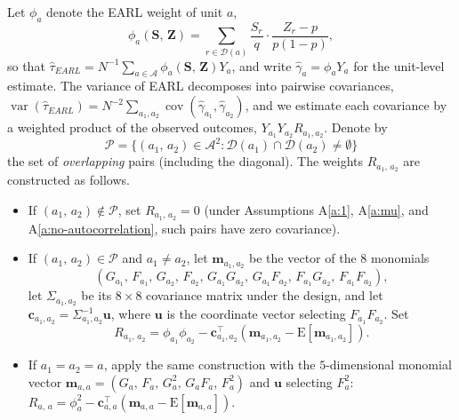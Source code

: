 \documentclass[sigconf,nonacm]{acmart}
\newcommand{\E}{\mathrm E}
\DeclareMathOperator{\var}{var}
\DeclareMathOperator{\cov}{cov}
\begin{document}
Let $\phi_a$ denote the EARL weight of unit $a$,
\begin{equation}\label{def:phi}
    \phi_a(\mathbf S,\,\mathbf Z) = \sum_{r\in\mathcal D(a)}\frac{S_r}{q}\cdot\frac{Z_r - p}{p(1-p)},
\end{equation}
so that $\hat\tau^{\phantom{1}}_{EARL} = N^{-1}\sum_{a\in\mathcal A}\phi_a(\mathbf S,\,\mathbf Z)Y_a$, and write $\hat\gamma_a = \phi_aY_a$ for the unit-level estimate. The variance of EARL decomposes into pairwise covariances, $\var(\hat\tau_{EARL}) = N^{-2}\sum_{a_1,a_2}\cov(\hat\gamma_{a_1},\hat\gamma_{a_2})$, and we estimate each covariance by a weighted product of the observed outcomes, $Y_{a_1}Y_{a_2}R_{a_1,a_2}$. Denote by
$$
\mathcal P = \{(a_1,\,a_2)\in\mathcal A^2\colon \mathcal D(a_1)\cap\mathcal D(a_2)\neq\emptyset\}
$$
the set of \emph{overlapping} pairs (including the diagonal). The weights $R_{a_1,\,a_2}$ are constructed as follows.
\begin{itemize}
    \item If $(a_1,\,a_2)\notin\mathcal P$, set $R_{a_1,\,a_2}=0$ (under Assumptions A\ref{a:1}, A\ref{a:mu}, and A\ref{a:no-autocorrelation}, such pairs have zero covariance).
    \item If $(a_1,\,a_2)\in\mathcal P$ and $a_1\neq a_2$, let $\mathbf m_{a_1,a_2}$ be the vector of the $8$ monomials
    \begin{equation*}
        (G_{a_1},\,F_{a_1},\,G_{a_2},\,F_{a_2},\,G_{a_1}G_{a_2},\,G_{a_1}F_{a_2},\,F_{a_1}G_{a_2},\,F_{a_1}F_{a_2}),
    \end{equation*}
    let $\Sigma_{a_1,a_2}$ be its $8\times 8$ covariance matrix under the design, and let $\mathbf c_{a_1,a_2} = \Sigma^{-1}_{a_1,a_2}\mathbf u$, where $\mathbf u$ is the coordinate vector selecting $F_{a_1}F_{a_2}$. Set
    \begin{equation}\label{def:R}
        R_{a_1,\,a_2} = \phi_{a_1}\phi_{a_2} - \mathbf c_{a_1,a_2}^{\top}\left(\mathbf m_{a_1,a_2} - \E[\mathbf m_{a_1,a_2}]\right).
    \end{equation}
    \item If $a_1=a_2=a$, apply the same construction with the $5$-dimen\-sional monomial vector $\mathbf m_{a,a} = (G_a,\,F_a,\,G_a^2,\,G_aF_a,\,F_a^2)$ and $\mathbf u$ selecting $F_a^2$:
    $R_{a,\,a} = \phi_{a}^2 - \mathbf c_{a,a}^{\top}(\mathbf m_{a,a} - \E[\mathbf m_{a,a}])$.
\end{itemize}
\end{document}

